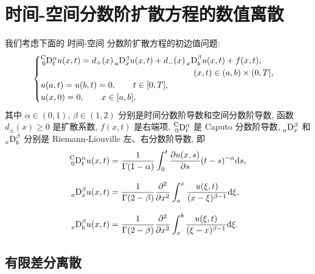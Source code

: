 \documentclass{ecnumaster}
\begin{document}
\chapter{时间-空间分数阶扩散方程的数值离散}
我们考虑下面的 时间-空间 分数阶扩散方程的初边值问题:
\begin{equation}\label{eq31}
\begin{cases}
\prescript{\mathrm{C}}{0}{\mathrm{D}}_t^{\alpha} u(x, t) =
d_+(x) \prescript{}{a}{\mathrm{D}}_x^\beta u(x, t)
+ d_-(x) \prescript{}{x}{\mathrm{D}}_b^\beta u(x, t)
 + f(x, t), \\
\qquad \qquad \qquad \qquad \qquad \qquad \qquad \qquad \qquad (x, t) \in (a, b) \times (0, T],\\
u(a, t) = u(b, t) = 0,  \qquad t \in [0, T],\\
u(x, 0) = 0, \qquad x \in [a, b],
 \end{cases}
\end{equation}
其中 $\alpha\in(0,1)$, $\beta\in(1,2)$ 分别是时间分数阶导数和空间分数阶导数,
函数 $d_{\pm}(x)\geq 0$ 是扩散系数, $f(x, t)$ 是右端项,
$\prescript{\mathrm{C}}{0}{\mathrm{D}}_t^{\alpha}$ 是 Caputo 分数阶导数,
$\prescript{}{a}{\mathrm{D}}_x^{\beta}$ 和 $\prescript{}{x}{\mathrm{D}}_b^{\beta}$
分别是 Riemann-Liouville 左、右分数阶导数, 即
\begin{align*}
  \prescript{\mathrm{C}}{0}{\mathrm{D}}_t^{\alpha}u(x, t)
  & = \frac{1}{\Gamma(1 - \alpha)}
    \int_0^t\frac{\partial u(x, s)}{\partial s}(t - s)^{-\alpha}\mathrm{d}s, \\[2ex]
  \prescript{}{a}{\mathrm{D}}_x^{\beta}u(x, t)
  & = \frac{1}{\Gamma(2 - \beta)}\frac{\partial ^2}{\partial x^2}
     \int_a^x\frac{u(\xi, t)}{(x - \xi)^{\beta - 1}}\mathrm{d}\xi,\\[2ex]
  \prescript{}{x}{\mathrm{D}}_b^{\beta}u(x, t)
  & = \frac{1}{\Gamma(2 - \beta)} \frac{\partial ^2}{\partial x^2}
   \int_x^b \frac{u(\xi, t)}{(\xi - x)^{\beta - 1}}\mathrm{d}\xi.
\end{align*}

\section{有限差分离散}
\end{document}

